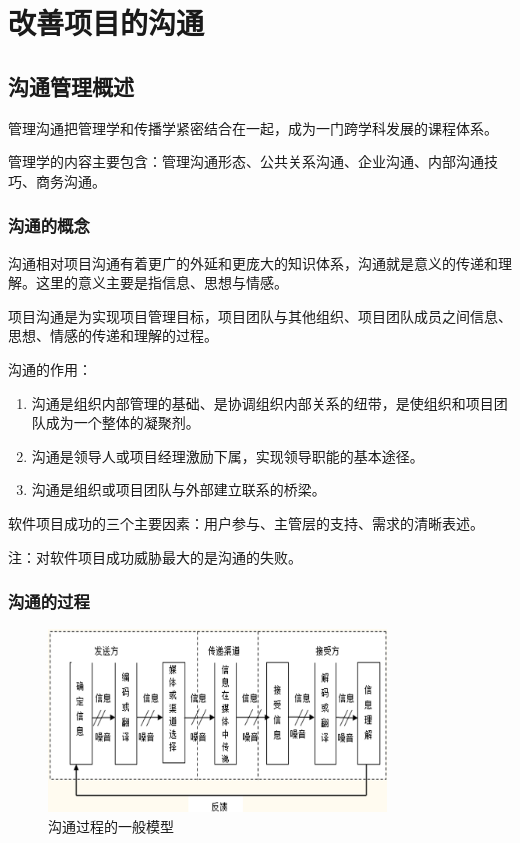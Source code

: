 \chapter{改善项目的沟通}
\section{沟通管理概述}
管理沟通把管理学和传播学紧密结合在一起，成为一门跨学科发展的课程体系。
\par 管理学的内容主要包含：管理沟通形态、公共关系沟通、企业沟通、内部沟通技巧、商务沟通。
\subsection{沟通的概念}
沟通相对项目沟通有着更广的外延和更庞大的知识体系，沟通就是意义的传递和理解。这里的意义主要是指信息、思想与情感。 
\par 项目沟通是为实现项目管理目标，项目团队与其他组织、项目团队成员之间信息、思想、情感的传递和理解的过程。 
\par 沟通的作用：
\begin{enumerate}
	\item 沟通是组织内部管理的基础、是协调组织内部关系的纽带，是使组织和项目团队成为一个整体的凝聚剂。
	\item 沟通是领导人或项目经理激励下属，实现领导职能的基本途径。
	\item 沟通是组织或项目团队与外部建立联系的桥梁。
\end{enumerate}
软件项目成功的三个主要因素：用户参与、主管层的支持、需求的清晰表述。
\par 注：对软件项目成功威胁最大的是沟通的失败。
\subsection{沟通的过程}
\begin{figure}[!h]
	\centering
	\includegraphics[width=0.8\textwidth]{image/9-1}
	\caption{沟通过程的一般模型}
\end{figure}
